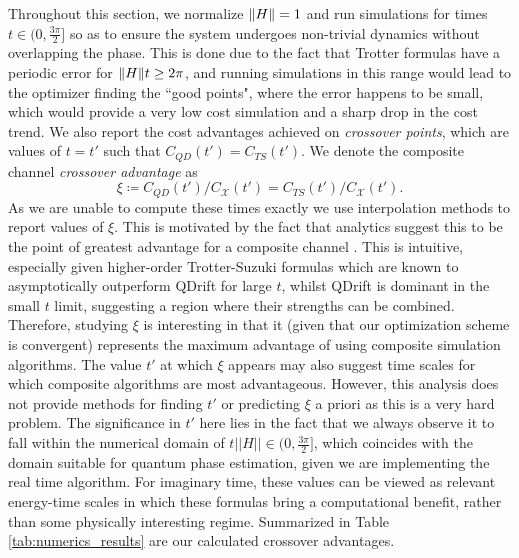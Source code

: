 Throughout this section, we normalize $\norm{H} = 1$ and run simulations for times $t \in (0, \frac{3\pi}{2}]$ so as to ensure the system undergoes non-trivial dynamics without overlapping the phase. This is done due to the fact that Trotter formulas have a periodic error for $\norm{H}t\geq 2\pi$, and running simulations in this range would lead to the optimizer finding the ``good points", where the error happens to be small, which would provide a very low cost simulation and a sharp drop in the cost trend. We also report the cost advantages achieved on \textit{crossover points}, which are values of $t=t'$ such that $C_{QD}(t') = C_{TS}(t')$. We denote the composite channel \textit{crossover advantage} as 
\begin{equation} \label{eq:crossover}
    \xi \coloneqq C_{QD}(t') / C_\mathcal{X}(t') = C_{TS}(t') / C_\mathcal{X}(t'). 
\end{equation}
As we are unable to compute these times exactly we use interpolation methods to report values of $\xi$. This is motivated by the fact that analytics suggest this to be the point of greatest advantage for a composite channel \cite{hagan2022composite}. This is intuitive, especially given higher-order Trotter-Suzuki formulas which are known to asymptotically outperform QDrift for large $t$, whilst QDrift is dominant in the small $t$ limit, suggesting a region where their strengths can be combined. Therefore, studying $\xi$ is interesting in that it (given that our optimization scheme is convergent) represents the maximum advantage of using composite simulation algorithms. The value $t'$ at which $\xi$ appears may also suggest time scales for which composite algorithms are most advantageous. However, this analysis does not provide methods for finding $t'$ or predicting $\xi$ a priori as this is a very hard problem. The significance in $t'$ here lies in the fact that we always observe it to fall within the numerical domain of $t||H||\in (0, \frac{3\pi}{2}]$, which coincides with the domain suitable for quantum phase estimation, given we are implementing the real time algorithm. For imaginary time, these values can be viewed as relevant energy-time scales in which these formulas bring a computational benefit, rather than some physically interesting regime. Summarized in Table \ref{tab:numerics_results} are our calculated crossover advantages.


